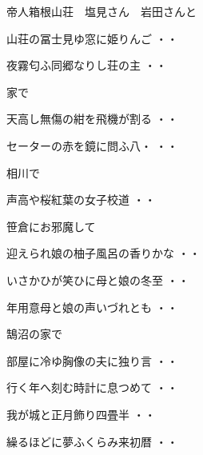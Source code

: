 \vspace{0.6cm}
帝人箱根山荘　塩見さん　岩田さんと
\begin{shiika}山荘の冨士見ゆ窓に姫りんご
\hfill{・・}\end{shiika}
\begin{shiika}夜霧匂ふ同郷なりし荘の主
\hfill{・・}\end{shiika}
\vspace{0.6cm}
家で
\begin{shiika}天高し無傷の紺を飛機が割る
\hfill{・・}\end{shiika}
\vspace{0.6cm}
\begin{shiika}セーターの赤を鏡に問ふ八・
\hfill{・・}\end{shiika}
\vspace{0.6cm}
相川で
\begin{shiika}声高や桜紅葉の女子校道
\hfill{・・}\end{shiika}
\vspace{0.6cm}
笹倉にお邪魔して
\begin{shiika}迎えられ娘の柚子風呂の香りかな
\hfill{・・}\end{shiika}
\begin{shiika}いさかひが笑ひに母と娘の冬至
\hfill{・・}\end{shiika}
\begin{shiika}年用意母と娘の声いづれとも
\hfill{・・}\end{shiika}
\vspace{0.6cm}
鵠沼の家で
\begin{shiika}部屋に冷ゆ胸像の夫に独り言
\hfill{・・}\end{shiika}
\begin{shiika}行く年へ刻む時計に息つめて
\hfill{・・}\end{shiika}
\begin{shiika}我が城と正月飾り四畳半
\hfill{・・}\end{shiika}
\begin{shiika}繰るほどに夢ふくらみ来初暦
\hfill{・・}\end{shiika}
